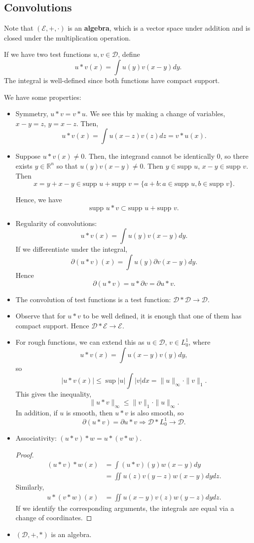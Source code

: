 \documentclass[11pt]{scrartcl}
\newcommand{\R}{\mathbb{R}}
\newcommand{\supp}{\text{supp }}
\begin{document}
\subsection{Convolutions}
Note that $(\mathcal E, +, \cdot)$ is an \textbf{algebra}, which is a vector space under addition and is closed under the multiplication operation.

If we have two test functions $u, v \in \mathcal D$, define $$u * v (x) = \int u(y)v(x-y) dy.$$
The integral is well-defined since both functions have compact support.

We have some properties:
\begin{itemize}
\item Symmetry, $u * v = v * u$.  We see this by making a change of variables, $x-y = z$, $y = x-z$.  Then,
$$u * v(x) = \int u(x-z)v(z)dz  = v*u(x).$$
\item Suppose $u *v (x) \ne 0$.  Then, the integrand cannot be identically $0$, so there exists $y \in \R^n$ so that $u(y)v(x-y) \ne 0$.  Then $y \in \supp u$, $x-y \in \supp v$.  Then $$x = y + x-y \in \supp u + \supp v = \{a + b : a \in \supp u, b \in \supp v\}.$$

Hence, we have $$\supp u*v \subset \supp u + \supp v.$$
\item Regularity of convolutions:
$$u * v(x) = \int u(y)v(x-y)dy.$$
If we differentiate under the integral, 
$$\partial(u * v)(x) = \int u(y) \partial v(x-y)dy.$$
Hence $$\partial(u*v) = u * \partial v = \partial u * v.$$
\item The convolution of test functions is a test function: $\mathcal D * \mathcal D \rightarrow \mathcal D$.  \item Observe that for $u*v$ to be well defined, it is enough that one of them has compact support.  Hence $\mathcal D * \mathcal E \rightarrow \mathcal E$.                                       
\item For rough functions, we can extend this as $u \in \mathcal D$, $v \in L_0^1$, where 
$$u * v(x) = \int u(x-y)v(y)dy,$$
so $$|u*v(x)| \le \sup |u|\int |v|dx = \|u\|_\infty \cdot  \|v\|_1.$$
This gives the inequality,
$$\|u*v\|_\infty\le \|v\|_1 \cdot \|u\|_\infty.$$
In addition, if $u$ is smooth, then $u*v$ is also smooth, so 
$$\partial(u*v) = \partial u * v \Rightarrow \mathcal D * L_0^1 \rightarrow \mathcal D.$$
\item Associativity: $(u*v)*w = u*(v*w)$.    
\begin{proof}
\begin{align*}
(u*v)*w(x) &= \int(u*v)(y) w(x-y)dy \\
&=\iint u(z) v(y-z) w(x-y)dydz.
\end{align*}
Similarly,
\begin{align*}
u*(v*w)(x) &= \iint u(x-y)v(z)w(y-z) dydz.
\end{align*}
If we identify the corresponding arguments, the integrals are equal via a change of coordinates.
\end{proof}
\item $(\mathcal D, +, *)$ is an algebra.
\end{itemize}
\end{document}
